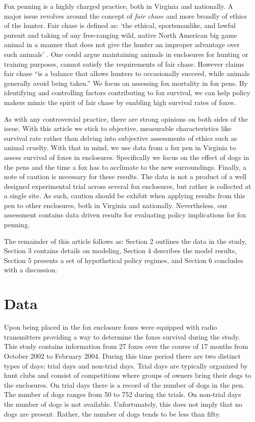 \documentclass[aoas,preprint]{imsart}
\numberwithin{equation}{section}
\theoremstyle{plain}
\begin{document}
Fox penning is a highly charged practice, both in Virginia and nationally. A major issue revolves around the concept of \emph{fair chase} \citep{posewitz} and more broadly of ethics of the hunter. Fair chase is defined as: `the ethical, sportsmanlike, and lawful pursuit and taking of any free-ranging wild, native North American big game animal in a manner that does not give the hunter an improper advantage over such animals' \citep{boone}. One could argue maintaining animals in enclosures for hunting or training purposes, cannot satisfy the requirements of fair chase.  However \cite{posewitz} claims fair chase ``is a balance that allows hunters to occasionally succeed, while animals generally avoid being taken.'' We focus on assessing fox mortality in fox pens. By identifying and controlling factors contributing to fox survival, we can help policy makers mimic the spirit of fair chase by enabling high survival rates of foxes.

As with any controversial practice, there are strong opinions on both sides of the issue. With this article we stick to objective, measurable characteristics like survival rate rather than delving into subjective assessments of ethics such as animal cruelty. With that in mind, we use data from a fox pen in Virginia to assess survival of foxes in enclosures. Specifically we focus on the effect of dogs in the pens and the time a fox has to acclimate to the new surroundings. Finally, a note of caution is necessary for these results. The data is not a product of a well designed experimental trial across several fox enclosures, but rather is collected at a single site. As such, caution should be exhibit when applying results from this pen to other enclosures, both in Virginia and nationally. Nevertheless, our assessment contains data driven results for evaluating policy implications for fox penning.

The remainder of this article follows as: Section 2 outlines the data in the study, Section 3 contains details on modeling, Section 4 describes the model results, Section 5 presents a set of hypothetical policy regimes, and Section 6 concludes with a discussion.

\section{Data} Upon being placed in the fox enclosure foxes were equipped with radio transmitters providing a way to determine the foxes survival during the study. This study contains information from 27 foxes over the course of 17 months from October 2002 to February 2004. During this time period there are two distinct types of days: trial days and non-trial days. Trial days are typically organized by hunt clubs and consist of competitions where groups of owners bring their dogs to the enclosures. On trial days there is a record of the number of dogs in the pen. The number of dogs ranges from 50 to 752 during the trials. On non-trial days the number of dogs is not available. Unfortunately, this does not imply that no dogs are present. Rather, the number of dogs tends to be less than fifty.
\end{document}
